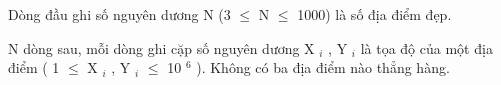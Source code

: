 Dòng đầu ghi số nguyên dương N (3  $\le$  N  $\le$  1000) là số địa điểm đẹp.  

   N dòng sau, mỗi dòng ghi cặp số nguyên dương X   $_    i   $   , Y   $_    i   $   là tọa độ của một địa điểm ( 1  $\le$  X   $_    i   $   , Y   $_    i   $    $\le$  10   $^    6   $   ). Không có ba địa điểm nào thẳng hàng.  

\